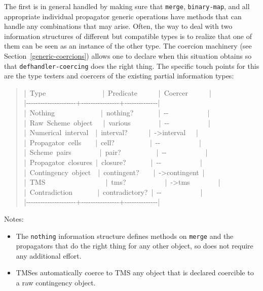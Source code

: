 \documentclass[12pt,letterpaper,english]{article}
\begin{document}
The first is in general handled by making sure that \texttt{merge},
\texttt{binary-map}, and all appropriate individual propagator generic
operations have methods that can handle any combinations that may
arise.  Often, the way to deal with two information structures of
different but compatible types is to realize that one of them can be
seen as an instance of the other type.  The coercion machinery
(see Section~\ref{generic-coercions})
allows one to declare when this situation obtains so that
\texttt{defhandler-coercing} does the right thing.  The specific touch
points for this are the type testers and coercers of the existing
partial information types:
\begin{quote}{\ttfamily \raggedright \noindent
|~Type~~~~~~~~~~~~~~~~|~Predicate~~~~~~|~Coercer~~~~~~|~\\
|-{}-{}-{}-{}-{}-{}-{}-{}-{}-{}-{}-{}-{}-{}-{}-{}-{}-{}-{}-{}-+-{}-{}-{}-{}-{}-{}-{}-{}-{}-{}-{}-{}-{}-{}-{}-+-{}-{}-{}-{}-{}-{}-{}-{}-{}-{}-{}-{}-{}-|~\\
|~Nothing~~~~~~~~~~~~~|~nothing?~~~~~~~|~-{}-~~~~~~~~~~~|~\\
|~Raw~Scheme~object~~~|~various~~~~~~~~|~-{}-~~~~~~~~~~~|~\\
|~Numerical~interval~~|~interval?~~~~~~|~->interval~~~|~\\
|~Propagator~cells~~~~|~cell?~~~~~~~~~~|~-{}-~~~~~~~~~~~|~\\
|~Scheme~pairs~~~~~~~~|~pair?~~~~~~~~~~|~-{}-~~~~~~~~~~~|~\\
|~Propagator~closures~|~closure?~~~~~~~|~-{}-~~~~~~~~~~~|~\\
|~Contingency~object~~|~contingent?~~~~|~->contingent~|~\\
|~TMS~~~~~~~~~~~~~~~~~|~tms?~~~~~~~~~~~|~->tms~~~~~~~~|~\\
|~Contradiction~~~~~~~|~contradictory?~|~-{}-~~~~~~~~~~~|~\\
|-{}-{}-{}-{}-{}-{}-{}-{}-{}-{}-{}-{}-{}-{}-{}-{}-{}-{}-{}-{}-+-{}-{}-{}-{}-{}-{}-{}-{}-{}-{}-{}-{}-{}-{}-{}-+-{}-{}-{}-{}-{}-{}-{}-{}-{}-{}-{}-{}-{}-|
}\end{quote}

Notes:
\begin{itemize}
\item {} 
The \texttt{nothing} information structure defines methods on \texttt{merge}
and the propagators that do the right thing for any other object, so
does not require any additional effort.

\item {} 
TMSes automatically coerce to TMS any object that is declared
coercible to a raw contingency object.

\end{itemize}
\end{document}
